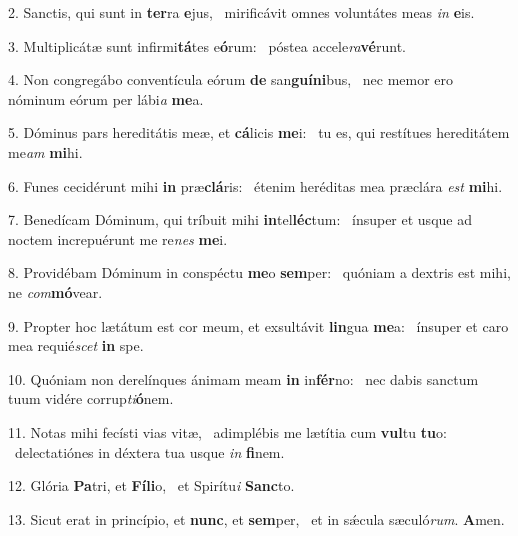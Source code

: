 2. Sanctis, qui sunt in \textbf{ter}ra \textbf{e}jus, \ast\  mirificávit omnes voluntátes meas \textit{in} \textbf{e}is.\

3. Multiplicátæ sunt infirmi\textbf{tá}tes e\textbf{ó}rum: \ast\  póstea accele\textit{ra}\textbf{vé}runt.\

4. Non congregábo conventícula eórum \textbf{de} san\textbf{guí}\textbf{ni}bus, \ast\  nec memor ero nóminum eórum per lábi\textit{a} \textbf{me}a.\

5. Dóminus pars hereditátis meæ, et \textbf{cá}licis \textbf{me}i: \ast\  tu es, qui restítues hereditátem me\textit{am} \textbf{mi}hi.\

6. Funes cecidérunt mihi \textbf{in} præ\textbf{clá}ris: \ast\  étenim heréditas mea præclára \textit{est} \textbf{mi}hi.\

7. Benedícam Dóminum, qui tríbuit mihi \textbf{in}tel\textbf{léc}tum: \ast\  ínsuper et usque ad noctem increpuérunt me re\textit{nes} \textbf{me}i.\

8. Providébam Dóminum in conspéctu \textbf{me}o \textbf{sem}per: \ast\  quóniam a dextris est mihi, ne \textit{com}\textbf{mó}vear.\

9. Propter hoc lætátum est cor meum, et exsultávit \textbf{lin}gua \textbf{me}a: \ast\  ínsuper et caro mea requié\textit{scet} \textbf{in} spe.\

10. Quóniam non derelínques ánimam meam \textbf{in} in\textbf{fér}no: \ast\  nec dabis sanctum tuum vidére corrup\textit{ti}\textbf{ó}nem.\

11. Notas mihi fecísti vias vitæ, \dag\  adimplébis me lætítia cum \textbf{vul}tu \textbf{tu}o: \ast\  delectatiónes in déxtera tua usque \textit{in} \textbf{fi}nem.\

12. Glória \textbf{Pa}tri, et \textbf{Fí}\textbf{li}o, \ast\  et Spirítu\textit{i} \textbf{Sanc}to.\

13. Sicut erat in princípio, et \textbf{nunc}, et \textbf{sem}per, \ast\  et in sǽcula sæculó\textit{rum}. \textbf{A}men.\

